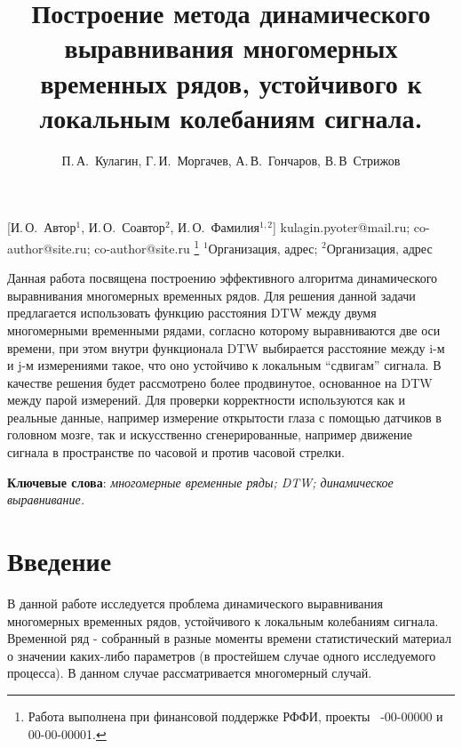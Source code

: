 \documentclass[12pt, twoside]{article}
\begin{document}

\title
    [Шаблон статьи для публикации] %
    {Построение метода динамического выравнивания многомерных временных рядов, устойчивого к локальным колебаниям сигнала.}
\author
    [И.\,О.~Автор] %
    {П.\,А.~Кулагин, Г.\,И.~Моргачев, А.\,В.~Гончаров, В.\,В~Стрижов} %
    [И.\,О.~Автор$^1$, И.\,О.~Соавтор$^2$, И.\,О.~Фамилия$^{1,2}$] %
\email
    {kulagin.pyoter@mail.ru; co-author@site.ru;  co-author@site.ru}
\thanks
    {Работа выполнена при
     финансовой поддержке РФФИ, проекты \No\ -00-00000 и 00-00-00001.}
\organization
    {$^1$Организация, адрес; $^2$Организация, адрес}
\abstract
    {Данная работа посвящена построению эффективного алгоритма динамического выравнивания многомерных временных рядов. Для решения данной задачи предлагается использовать функцию расстояния DTW между двумя многомерными временными рядами, согласно которому выравниваются две оси времени, при этом внутри функционала DTW выбирается расстояние между i-м и j-м измерениями такое, что оно устойчиво к локальным “сдвигам” сигнала. В качестве решения будет рассмотрено более продвинутое, основанное на DTW между парой измерений. Для проверки корректности используются как и реальные данные, например измерение открытости глаза с помощью датчиков в головном мозге, так и искусственно сгенерированные, например движение сигнала в пространстве по часовой и против часовой стрелки.
	
\bigskip
\noindent
\textbf{Ключевые слова}: \emph {многомерные временные ряды; DTW; динамическое выравнивание.}
}

\maketitle
\linenumbers

\section{Введение}

В данной работе исследуется проблема динамического выравнивания многомерных временных рядов, устойчивого к локальным колебаниям сигнала.
Временной ряд -  собранный в разные моменты времени статистический материал о значении каких-либо параметров (в простейшем случае одного исследуемого процесса). В данном случае рассматривается многомерный случай.
\end{document}
